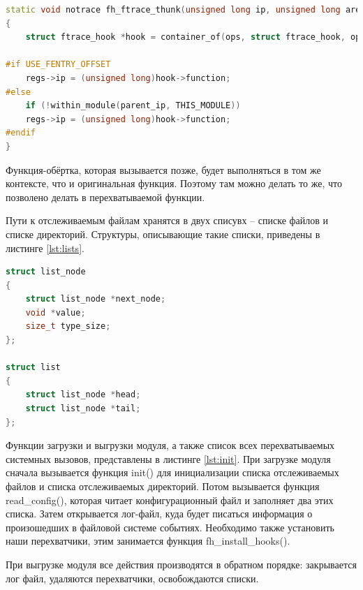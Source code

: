 \documentclass[a4paper,14pt]{article}
\begin{document}
\begin{lstlisting}[language=C++,label={lst:callback}, caption=\text{Обратный вызов для ftrace.}]
static void notrace fh_ftrace_thunk(unsigned long ip, unsigned long arent_ip, struct ftrace_ops *ops, struct pt_regs *regs)
{
	struct ftrace_hook *hook = container_of(ops, struct ftrace_hook, ops);

#if USE_FENTRY_OFFSET
	regs->ip = (unsigned long)hook->function;
#else
	if (!within_module(parent_ip, THIS_MODULE))
	regs->ip = (unsigned long)hook->function;
#endif
}
\end{lstlisting}

Функция-обёртка, которая вызывается позже, будет выполняться в том же контексте, что и оригинальная функция. Поэтому там можно делать то же, что позволено делать в перехватываемой функции.

Пути к отслеживаемым файлам хранятся в двух списувх -- списке файлов и списке директорий. Структуры, описывающие такие списки, приведены в листинге \ref{lst:lists}.


\begin{lstlisting}[language=C++,label={lst:lists}, caption=\text{Реализация списка.}]
struct list_node
{
	struct list_node *next_node;
	void *value;
	size_t type_size;
};

struct list
{
	struct list_node *head;
	struct list_node *tail;
};
\end{lstlisting}

Функции загрузки и выгрузки модуля, а также список всех перехватываемых системных вызовов, представлены в листинге \ref{lst:init}. При загрузке модуля сначала вызывается функция init() для инициализации списка отслеживаемых файлов и списка отслеживаемых директорий. Потом вызывается функция read\_config(), которая читает конфигурационный файл и заполняет два этих списка. Затем открывается лог-файл, куда будет писаться информация о произошедших в файловой системе событиях. Необходимо также установить наши перехватчики, этим занимается функция fh\_install\_hooks().

При выгрузке модуля все действия производятся в обратном порядке: закрывается лог файл, удаляются перехватчики, освобождаются списки.
\end{document}
